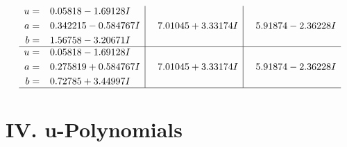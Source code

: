 \documentclass[1p]{elsarticle_modified}
\theoremstyle{definition}
\begin{document}
$$\begin{array}{c|c|c}
\begin{aligned}
u &= \phantom{-}0.05818 - 1.69128 I \\
a &= \phantom{-}0.342215 - 0.584767 I \\
b &= \phantom{-}1.56758 - 3.20671 I\end{aligned}
 & \phantom{-}7.01045 + 3.33174 I & \phantom{-}5.91874 - 2.36228 I \\ \hline\begin{aligned}
u &= \phantom{-}0.05818 - 1.69128 I \\
a &= \phantom{-}0.275819 + 0.584767 I \\
b &= \phantom{-}0.72785 + 3.44997 I\end{aligned}
 & \phantom{-}7.01045 + 3.33174 I & \phantom{-}5.91874 - 2.36228 I\\
 \hline 
 \end{array}$$\newpage
\newpage\renewcommand{\arraystretch}{1}
\centering \section*{ IV. u-Polynomials}
\end{document}
